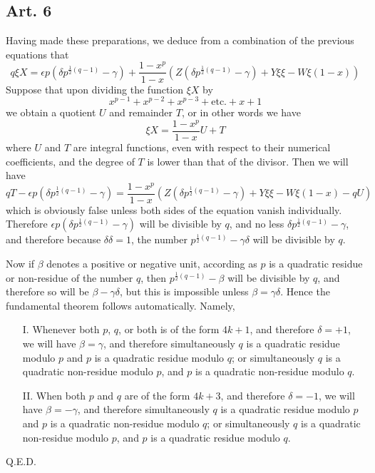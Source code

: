 \documentclass{book}
\theoremstyle{plain}
\theoremstyle{remark}
\begin{document}
\subsection*{Art. 6}

Having made these preparations, we deduce from a combination of the previous equations that
\[ q\xi X = \epsilon p \left(\delta p^{\frac{1}{2}(q-1)} - \gamma \right)  + \frac{1-x^p}{1-x} \left(Z\left(\delta p^{\frac{1}{2}(q-1)} - \gamma\right)+Y\xi \xi - W \xi(1-x) \right) \]
Suppose that upon dividing the function $\xi X$ by 
\[ x^{p-1}+x^{p-2} + x^{p-3} + \textrm{etc.} + x + 1 \]
we obtain a quotient $U$ and remainder $T$, or in other words we have 
\[ \xi X = \frac{1-x^p}{1-x} U + T \]
where $U$ and $T$ are integral functions, even with respect to their numerical coefficients, and the degree of $T$ is lower than that of the divisor.  Then we will have 
\[ qT- \epsilon p \left(\delta p^{\frac{1}{2}(q-1)} - \gamma \right)  = \frac{1-x^p}{1-x} \left(Z\left(\delta p^{\frac{1}{2}(q-1)} - \gamma\right)+Y\xi \xi - W \xi(1-x) - q U\right) \]
which is obviously false unless both sides of the equation vanish individually.  Therefore $\epsilon p \left(\delta p^{\frac{1}{2}(q-1)} - \gamma \right)$ will be divisible by $q$, and no less $\delta p^{\frac{1}{2}(q-1)}-\gamma$, and therefore because $\delta\delta=1$, the number $p^{\frac{1}{2}(q-1)} - \gamma \delta$ will be divisible by $q$. 

Now if $\beta$ denotes a positive or negative unit, according as $p$ is a quadratic residue or non-residue of the number $q$, then $p^{\frac{1}{2}(q-1)} -\beta$ will be divisible by $q$, and therefore so will be $\beta - \gamma \delta$, but this is impossible unless $\beta = \gamma \delta$.  Hence the fundamental theorem follows automatically.  Namely,
\begin{enumerate}
\item[I.] Whenever both $p$, $q$, or both is of the form $4k+1$, and therefore $\delta = +1$, we will have $\beta = \gamma$, and therefore simultaneously $q$ is a quadratic residue modulo $p$ and $p$ is a quadratic residue modulo $q$; or simultaneously $q$ is a quadratic non-residue modulo $p$, and $p$ is a quadratic non-residue modulo $q$.  
\item[II.] When both $p$ and $q$ are of the form $4k+3$, and therefore $\delta = -1$, we will have $\beta = -\gamma$, and  therefore simultaneously $q$ is a quadratic residue modulo $p$ and $p$ is a quadratic non-residue modulo $q$; or simultaneously $q$ is a quadratic non-residue modulo $p$, and $p$ is a quadratic residue modulo $q$. 
\end{enumerate}
Q.E.D.
\end{document}
